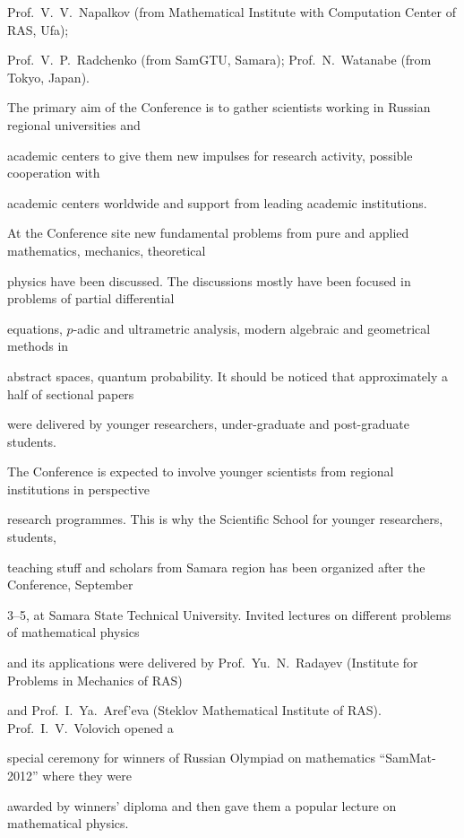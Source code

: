 Prof.~V.~V.~Napalkov (from Mathematical Institute with Computation Center of RAS, Ufa);

Prof.~V.~P.~Radchenko (from SamGTU, Samara); Prof.~N.~Watanabe (from Tokyo, Japan).





The primary aim of the Conference is to gather scientists working in Russian regional universities and

academic centers to give them new impulses for research activity, possible cooperation with

academic centers worldwide and support from leading academic institutions.

At the Conference site new fundamental problems from pure and applied mathematics, mechanics, theoretical

physics have been discussed. The discussions mostly have been focused in problems of partial differential

equations, $p$-adic and ultrametric analysis, modern algebraic and geometrical methods in

abstract spaces, quantum probability. It should be noticed that approximately a half of sectional papers

were delivered by younger researchers, under-graduate and post-graduate students.





The Conference is expected to involve younger scientists from regional institutions in perspective

research programmes. This is why the Scientific School for younger researchers, students,

teaching stuff and scholars from Samara region has been organized after the Conference, September

3--5, at Samara State Technical University. Invited lectures on different problems of mathematical physics

and its applications were delivered by Prof.~Yu.~N.~Radayev (Institute for Problems in Mechanics of RAS)

and Prof.~I.~Ya.~Aref'eva (Steklov Mathematical Institute of RAS). Prof.~I.~V.~Volovich opened a

special ceremony for winners of Russian Olympiad on mathematics ``SamMat-2012'' where they were

awarded by winners' diploma and then gave them a popular lecture on mathematical physics.

